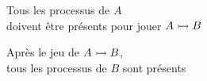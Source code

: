 \begin{frame}[c]
\begin{columns}
\begin{column}{.55\textwidth}
\begin{center}
\vspace*{.5cm}


\vspace*{.5cm}
Tous les processus de $A$\\
doivent être présents pour jouer $\mbox{$A \rightarrowtail B$}$

\medskip
Après le jeu de $\mbox{$A \rightarrowtail B$}$,\\
tous les processus de $B$ sont présents
% 
% 
% 

\end{center}
\end{column}
\end{columns}


\end{frame}
